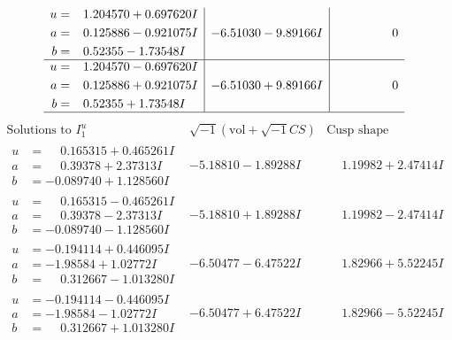 \documentclass[1p]{elsarticle_modified}
\theoremstyle{definition}
\newcommand{\I}{\sqrt{-1}}
\begin{document}
$$\begin{array}{c|c|c}
\begin{aligned}
u &= \phantom{-}1.204570 + 0.697620 I \\
a &= \phantom{-}0.125886 - 0.921075 I \\
b &= \phantom{-}0.52355 - 1.73548 I\end{aligned}
 & -6.51030 - 9.89166 I & \phantom{-0.000000 } 0 \\ \hline\begin{aligned}
u &= \phantom{-}1.204570 - 0.697620 I \\
a &= \phantom{-}0.125886 + 0.921075 I \\
b &= \phantom{-}0.52355 + 1.73548 I\end{aligned}
 & -6.51030 + 9.89166 I & \phantom{-0.000000 } 0\\
 \hline 
 \end{array}$$\newpage$$\begin{array}{c|c|c}  
\text{Solutions to }I^u_{1}& \I (\text{vol} + \sqrt{-1}CS) & \text{Cusp shape}\\
 \hline 
\begin{aligned}
u &= \phantom{-}0.165315 + 0.465261 I \\
a &= \phantom{-}0.39378 + 2.37313 I \\
b &= -0.089740 + 1.128560 I\end{aligned}
 & -5.18810 - 1.89288 I & \phantom{-}1.19982 + 2.47414 I \\ \hline\begin{aligned}
u &= \phantom{-}0.165315 - 0.465261 I \\
a &= \phantom{-}0.39378 - 2.37313 I \\
b &= -0.089740 - 1.128560 I\end{aligned}
 & -5.18810 + 1.89288 I & \phantom{-}1.19982 - 2.47414 I \\ \hline\begin{aligned}
u &= -0.194114 + 0.446095 I \\
a &= -1.98584 + 1.02772 I \\
b &= \phantom{-}0.312667 - 1.013280 I\end{aligned}
 & -6.50477 - 6.47522 I & \phantom{-}1.82966 + 5.52245 I \\ \hline\begin{aligned}
u &= -0.194114 - 0.446095 I \\
a &= -1.98584 - 1.02772 I \\
b &= \phantom{-}0.312667 + 1.013280 I\end{aligned}
 & -6.50477 + 6.47522 I & \phantom{-}1.82966 - 5.52245 I \\ \hline\begin{aligned}

\end{aligned}
\end{array}$$
\end{document}
